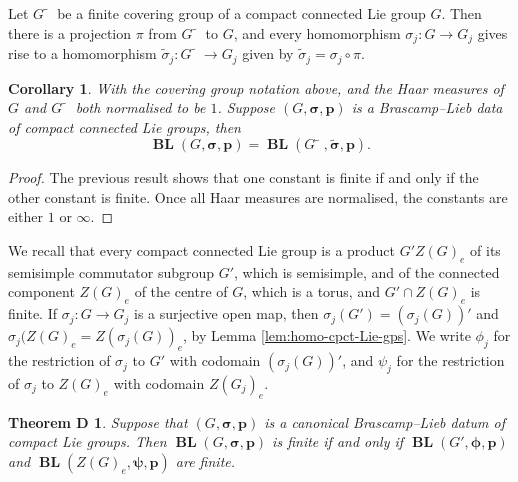 \documentclass[12pt,twoside,a4paper]{amsart}
\newtheorem*{thmD}{Theorem D}
\newtheorem{cor}[thm]{Corollary}%
\theoremstyle{definition}
\theoremstyle{remark}
\numberwithin{equation}{section}
\newcommand{\aftertilde}{\tilde{\phantom{n}}}
\newcommand{\BL}{\operatorname{\mathbf{BL}}}
\newcommand{\bss}{\boldsymbol{\sigma}}
\newcommand{\bsts}{\boldsymbol{\tilde\sigma}}
\newcommand{\bsphi}{\boldsymbol{\phi}}
\newcommand{\bspsi}{\boldsymbol{\psi}}
\newcommand{\bsp}{\boldsymbol{p}}
\begin{document}
Let $ G\aftertilde$ be a finite covering group of a compact connected Lie group $G$.
Then there is a projection $\pi$ from $G\aftertilde$ to $G$, and every homomorphism $\sigma_j\colon G \to G_j$ gives rise to a homomorphism $\tilde\sigma_j\colon   G\aftertilde \to G_j$ given by $\tilde\sigma_j = \sigma_j \circ \pi$.

\begin{cor}\label{BL-covering}
With the covering group notation above, and the Haar measures of $G$ and $G\aftertilde$ both normalised to be $1$. 
Suppose $(G, \bss, \bsp)$ is a Brascamp--Lieb data of compact connected Lie groups, then
\[
\BL(G,\bss,\bsp) = \BL(G\aftertilde, \bsts, \bsp).
\]
\end{cor}
\begin{proof}
The previous result shows that one constant is finite if and only if the other constant is finite.
Once all Haar measures are normalised, the constants are either $1$ or $\infty$.
\end{proof}

We recall that every compact connected Lie group is a product $G' Z(G)_e$ of its semisimple commutator subgroup $G'$, which is semisimple, and of the connected component $Z(G)_e$ of the centre of $G$, which is a torus, and $G' \cap Z(G)_e$ is finite.
If $\sigma_j\colon  G \to G_j$ is a surjective open map, then $\sigma_j(G') = (\sigma_j(G))'$ and $\sigma_j(Z(G)_e = Z(\sigma_j(G))_e$, by Lemma \ref{lem:homo-cpct-Lie-gps}.
We write $\phi_j$  for the restriction of $\sigma_j$ to $G'$ with codomain $(\sigma_j(G))'$, and
$\psi_j$ for the restriction of $\sigma_j$ to $Z(G)_e$ with codomain $Z(G_j)_e$.

\begin{thmD}
Suppose that $(G, \bss,\bsp)$ is a canonical Brascamp--Lieb datum of compact Lie groups.
Then $\BL(G, \bss,\bsp)$ is finite if and only if $\BL(G', \bsphi,\bsp)$  and $\BL(Z(G)_e, \bspsi,\bsp)$  are finite.
\end{thmD}
\end{document}
